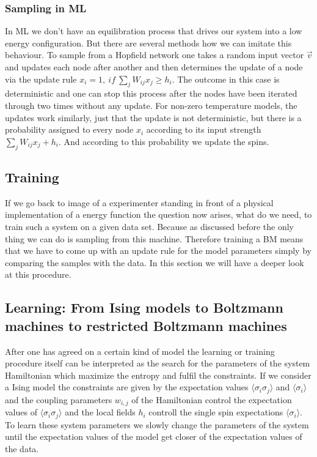 \documentclass[nofootinbib, superscriptaddress, prl]{revtex4}
\begin{document}
\subsubsection{Sampling in ML}

In ML we don't have an equilibration process that drives our system into a low energy configuration. But there are several methods how we can imitate this behaviour.
To sample from a Hopfield network one takes a random input vector $\vec{v}$ and updates each node after another and then determines the update of a node via the update rule $x_i = 1,~ if~\sum_j W_{ij} x_j \geq h_i$. The outcome in this case is deterministic and one can stop this process after the nodes have been iterated through two times without any update.
For non-zero temperature models, the updates work similarly, just that the update is not deterministic, but there is a probability assigned to every node $x_i$ according to its input strength $\sum_j W_{ij} x_j + h_i$. And according to this probability we update the spins.

\subsection{Training}

If we go back to image of a experimenter standing in front of a physical implementation of a energy function the question now arises, what do we need, to train such a system on a given data set. Because as discussed before the only thing we can do is sampling from this machine. Therefore training a BM means that we have to come up with an update rule for the model parameters simply by comparing the samples with the data. In this section we will have a deeper look at this procedure. 

\subsection{Learning: From Ising models to Boltzmann machines to restricted Boltzmann machines}

After one has agreed on a certain kind of model the learning or training procedure itself can be interpreted as the search for the parameters of the system Hamiltonian which maximize the entropy and fulfil the constraints. If we consider a Ising model the constraints are given by the expectation values $\langle \sigma_i \sigma_j \rangle $
 and $\langle \sigma_i \rangle$ and the coupling parameters $w_{i,j}$ of the Hamiltonian control the expectation values of $\langle \sigma_i \sigma_j \rangle $ and the local fields $h_i$ controll the single spin expectations $\langle \sigma_i \rangle$.
To learn these system parameters we slowly change the parameters of the system until the expectation values of the model get closer of the expectation values of the data. 
\end{document}
